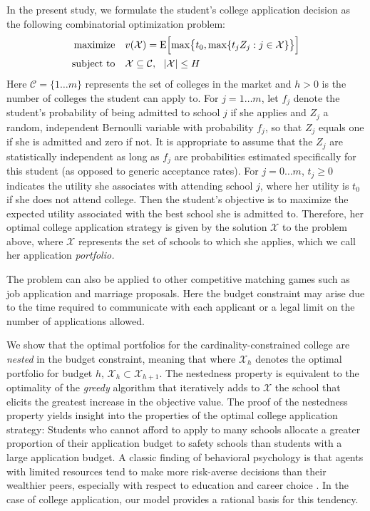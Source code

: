 In the present study, we formulate the student's college application decision as the following combinatorial optimization problem:
\begin{align} \label{headlineproblem}
\begin{split}
\text{maximize}\quad & v(\mathcal{X}) =  \operatorname{E}\Bigl[\max\bigr\{t_0,
\max\{t_j Z_j : j \in \mathcal{X}\}\bigr\}\Bigr] \\
\text{subject to}\quad & \mathcal{X} \subseteq \mathcal{C}, ~~|\mathcal{X}| \leq H
\end{split}
\end{align}
Here $\mathcal{C} = \{ 1 \dots m\}$ represents the set of colleges in the market and $h > 0$ is the number of colleges the student can apply to. For $j = 1 \dots m$, let $f_j$ denote the student's probability of being admitted to school $j$ if she applies and $Z_j$ a random, independent Bernoulli variable with probability $f_j$, so that $Z_j$ equals one if she is admitted and zero if not. It is appropriate to assume that the $Z_j$ are statistically independent as long as $f_j$ are probabilities estimated specifically for this student (as opposed to generic acceptance rates). For $j = 0\dots m$, $t_j\geq 0$ indicates the utility she associates with attending school $j$, where her utility is $t_0$ if she does not attend college. Then the student's objective is to maximize the expected utility associated with the best school she is admitted to. Therefore, her optimal college application strategy is given by the solution $\mathcal{X}$ to the problem above, where $\mathcal{X}$ represents the set of schools to which she applies, which we call her application \emph{portfolio.}

The problem can also be applied to other competitive matching games such as job application and marriage proposals. Here the budget constraint may arise due to the time required to communicate with each applicant or a legal limit on the number of applications allowed.

We show that the optimal portfolios for the cardinality-constrained college are \emph{nested} in the budget constraint, meaning that where $\mathcal{X}_h$ denotes the optimal portfolio for budget $h$, $\mathcal{X}_h \subset \mathcal{X}_{h+1}$. The nestedness property is equivalent to the optimality of the \emph{greedy} algorithm that iteratively adds to $\mathcal{X}$ the school that elicits the greatest increase in the objective value. The proof of the nestedness property yields insight into the properties of the optimal college application strategy: Students who cannot afford to apply to many schools allocate a greater proportion of their application budget to safety schools than students with a large application budget. A classic finding of behavioral psychology is that agents with limited resources tend to make more risk-averse decisions than their wealthier peers, especially with respect to education and career choice \cite{hartlaubandschneider2012,vanhuizenandalessie2019}. In the case of college application, our model provides a rational basis for this tendency. %

